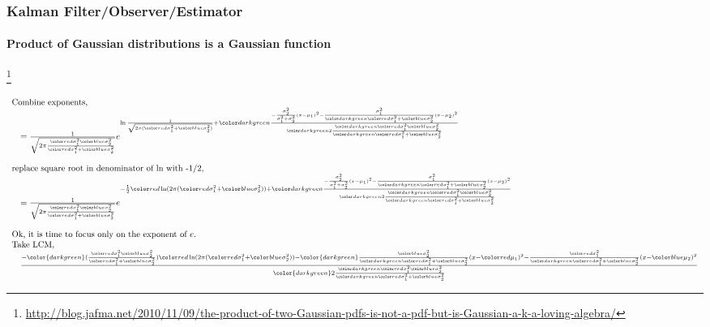 \documentclass{beamer}
\newenvironment{changemargin}[2]
	{
	  	\begin{list}{}
		{
			\setlength{\topsep}{0pt}%
			\setlength{\leftmargin}{#1}%
			\setlength{\rightmargin}{#2}%
			\setlength{\listparindent}{\parindent}%
			\setlength{\itemindent}{\parindent}%
			\setlength{\parsep}{\parskip}%
		}
	  	\item[]
		}
		{\end{list}
	}
\begin{document}
\begin{frame}
\frametitle{Kalman Filter/Observer/Estimator}
\framesubtitle{Product of Gaussian distributions is a Gaussian function}

\footnote{\tiny\hspace{-0.23in} \hspace{-0.25in}
\href{http://blog.jafma.net/2010/11/09/the-product-of-two-Gaussian-pdfs-is-not-a-pdf-but-is-Gaussian-a-k-a-loving-algebra/}{http://blog.jafma.net/2010/11/09/the-product-of-two-Gaussian-pdfs-is-not-a-pdf-but-is-Gaussian-a-k-a-loving-algebra/}}
\scriptsize

\begin{equation*}
\begin{array}{llllllll}
\multicolumn{2}{l}{\textrm{Combine exponents,}}\\
&=\frac{1}{\sqrt{2 \pi \frac { \varone \vartwo }{\varone + \vartwo} }}     e^{ \ln { \frac{1}{\sqrt{2 \pi ( \varone + \vartwo ) }} }  +           \xx}\\\\

\multicolumn{2}{l}{\textrm{replace square root in denominator of ln with -1/2,}}\\
&=\frac{1}{\sqrt{2 \pi \frac { \varone \vartwo }{\varone + \vartwo} }}     e^{  - \frac{1}{2} \myalpha  +           \xx}\\\\

\multicolumn{2}{l}{\textrm{Ok, it is time to focus only on the exponent of $e$.}}\\ 
\multicolumn{2}{l}{\textrm{Take LCM,}}\\

&\frac        { - {\color{darkgreen}( \frac { \varone \vartwo }{\varone + \vartwo})} \myalpha              - {\color{darkgreen}\frac { \vartwo }{\varsum} (x-\muone)^2 - \frac{ \varone }{\varsum} (x-\mutwo)^2          }}          {             {\color{darkgreen}2 \frac { \varprod }{\varsum}}} 
\end{array}
\end{equation*}
\end{frame}
\end{document}
